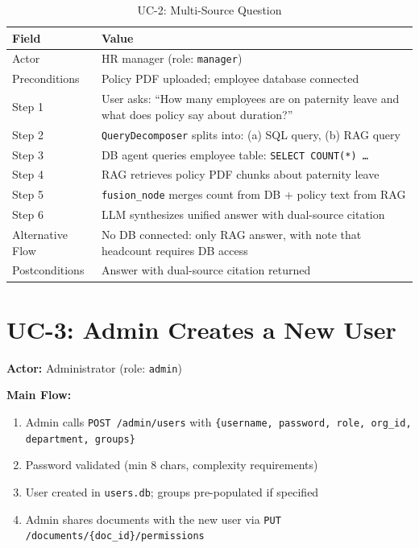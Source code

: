 \documentclass[12pt, a4paper, oneside]{report}
\newcommand{\kw}[1]{\texttt{\small #1}}
\begin{document}
\begin{table}[H]
\centering
{}
\begin{tabularx}{\linewidth}{lX}
\toprule
\rowcolor{rapidblue!10}
\textbf{Field} & \textbf{Value} \\
\midrule
Actor & HR manager (role: \kw{manager}) \\
Preconditions & Policy PDF uploaded; employee database connected \\
\midrule
Step 1 & User asks: ``How many employees are on paternity leave and what does policy say about duration?'' \\
Step 2 & \kw{QueryDecomposer} splits into: (a) SQL query, (b) RAG query \\
Step 3 & DB agent queries employee table: \kw{SELECT COUNT(*) \ldots} \\
Step 4 & RAG retrieves policy PDF chunks about paternity leave \\
Step 5 & \kw{fusion\_node} merges count from DB + policy text from RAG \\
Step 6 & LLM synthesizes unified answer with dual-source citation \\
\midrule
Alternative Flow & No DB connected: only RAG answer, with note that headcount requires DB access \\
Postconditions & Answer with dual-source citation returned \\
\bottomrule
\end{tabularx}
\caption{UC-2: Multi-Source Question}
\end{table}

\section{UC-3: Admin Creates a New User}

\textbf{Actor:} Administrator (role: \kw{admin})

\textbf{Main Flow:}
\begin{enumerate}
  \item Admin calls \kw{POST /admin/users} with \kw{\{username, password, role, org\_id, department, groups\}}
  \item Password validated (min 8 chars, complexity requirements)
  \item User created in \kw{users.db}; groups pre-populated if specified
  \item Admin shares documents with the new user via \kw{PUT /documents/\{doc\_id\}/permissions}
\end{enumerate}
\end{document}
